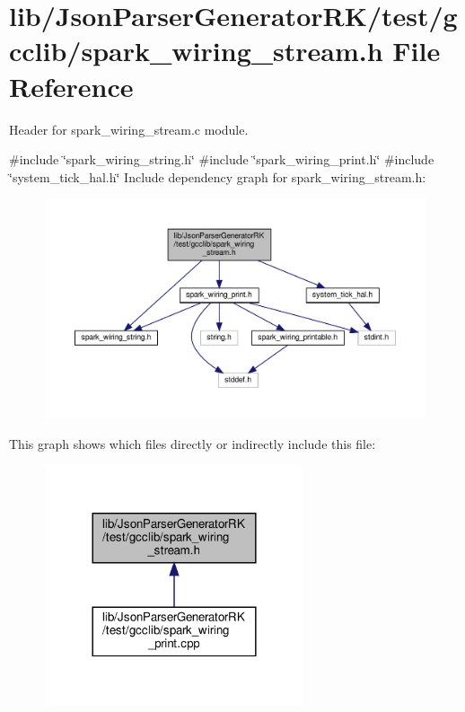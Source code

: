 \section{lib/\+Json\+Parser\+Generator\+R\+K/test/gcclib/spark\+\_\+wiring\+\_\+stream.h File Reference}
\label{spark__wiring__stream_8h}


Header for spark\+\_\+wiring\+\_\+stream.\+c module.  


{\ttfamily \#include \char`\"{}spark\+\_\+wiring\+\_\+string.\+h\char`\"{}}\newline
{\ttfamily \#include \char`\"{}spark\+\_\+wiring\+\_\+print.\+h\char`\"{}}\newline
{\ttfamily \#include \char`\"{}system\+\_\+tick\+\_\+hal.\+h\char`\"{}}\newline
Include dependency graph for spark\+\_\+wiring\+\_\+stream.\+h\+:\nopagebreak
\begin{figure}[H]
\begin{center}
\leavevmode
\includegraphics[width=350pt]{spark__wiring__stream_8h__incl}
\end{center}
\end{figure}
This graph shows which files directly or indirectly include this file\+:\nopagebreak
\begin{figure}[H]
\begin{center}
\leavevmode
\includegraphics[width=216pt]{spark__wiring__stream_8h__dep__incl}
\end{center}
\end{figure}
